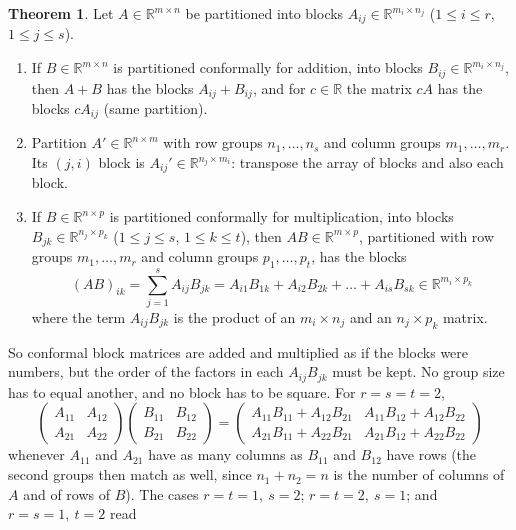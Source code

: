 \documentclass[12pt]{article}
\newcommand{\R}{\mathbb R}
\theoremstyle{definition}
\newtheorem{theorem}{Theorem}
\begin{document}
\begin{theorem}\label{r5b-thm-block}
Let \(A\in\R^{m\times n}\) be partitioned into blocks \(A_{ij}\in\R^{m_i\times n_j}\)
(\(1\leqslant i\leqslant r\), \(1\leqslant j\leqslant s\)).
\begin{enumerate}
\item If \(B\in\R^{m\times n}\) is partitioned conformally for addition, into blocks
\(B_{ij}\in\R^{m_i\times n_j}\), then \(A+B\) has the blocks \(A_{ij}+B_{ij}\), and for
\(c\in\R\) the matrix \(cA\) has the blocks \(cA_{ij}\) (same partition).
\item Partition \(A'\in\R^{n\times m}\) with row groups \(n_1,\dots,n_s\) and column groups
\(m_1,\dots,m_r\). Its \((j,i)\) block is \(A_{ij}'\in\R^{n_j\times m_i}\): transpose the array
of blocks and also each block.
\item If \(B\in\R^{n\times p}\) is partitioned conformally for multiplication, into blocks
\(B_{jk}\in\R^{n_j\times p_k}\) (\(1\leqslant j\leqslant s\), \(1\leqslant k\leqslant t\)), then
\(AB\in\R^{m\times p}\), partitioned with row groups \(m_1,\dots,m_r\) and column groups
\(p_1,\dots,p_t\), has the blocks
\[
(AB)_{ik}=\sum_{j=1}^sA_{ij}B_{jk}=A_{i1}B_{1k}+A_{i2}B_{2k}+\dots+A_{is}B_{sk}\in\R^{m_i\times p_k}
\]
where the term \(A_{ij}B_{jk}\) is the product of an \(m_i\times n_j\) and an \(n_j\times p_k\)
matrix.
\end{enumerate}
\end{theorem}
So conformal block matrices are added and multiplied as if the blocks were numbers, but the order
of the factors in each \(A_{ij}B_{jk}\) must be kept. No group size has to equal another, and no
block has to be square. For \(r=s=t=2\),
\[
\begin{pmatrix}A_{11}&A_{12}\\A_{21}&A_{22}\end{pmatrix}
\begin{pmatrix}B_{11}&B_{12}\\B_{21}&B_{22}\end{pmatrix}
=\begin{pmatrix}A_{11}B_{11}+A_{12}B_{21}&A_{11}B_{12}+A_{12}B_{22}\\
A_{21}B_{11}+A_{22}B_{21}&A_{21}B_{12}+A_{22}B_{22}\end{pmatrix}
\]
whenever \(A_{11}\) and \(A_{21}\) have as many columns as \(B_{11}\) and \(B_{12}\) have rows
(the second groups then match as well, since \(n_1+n_2=n\) is the number of columns of \(A\) and
of rows of \(B\)).
The cases \(r=t=1,\ s=2\); \(r=t=2,\ s=1\); and \(r=s=1,\ t=2\) read
\end{document}
